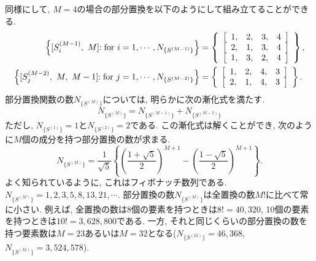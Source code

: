 同様にして, $M=4$の場合の部分置換を以下のようにして組み立てることができる. 
\begin{align}
  \left\{ [S_{i}^{(M-1)},~ M] \mathrm{ : for }~ i = 1, \cdots, N_{\{S^{(M-1)}\}}\right\}
 &=
  \left\{
         \begin{array}[tb]{cc}
          \left[\begin{array}{cccc} 1, & 2, & 3, & 4 \end{array} \right] \\
          \left[\begin{array}{cccc} 2, & 1, & 3, & 4 \end{array} \right] \\
          \left[\begin{array}{cccc} 1, & 3, & 2, & 4 \end{array} \right]
         \end{array}
  \right\},
  \notag
  \\
  \left\{ [S_{j}^{(M-2)},~ M ,~ M-1]
		  \mathrm{ : for }~ j = 1, \cdots, N_{\{S^{(M-2)}\}}
  \right\}
 &=
  \left\{
         \begin{array}[tb]{cc}
          \left[\begin{array}{cccc} 1, & 2, & 4, & 3 \end{array} \right] \\
          \left[\begin{array}{cccc} 2, & 1, & 4, & 3 \end{array} \right]
         \end{array}
  \right\} .
 \notag
\end{align}
部分置換関数の数$N_{\{S^{(M)}\}}$については, 明らかに次の漸化式を満たす. 
\begin{equation}
	N_{\{S^{(M)}\}} = N_{\{S^{(M-1)}\}} + N_{\{S^{(M-2)}\}}
\end{equation}
ただし, $N_{\{S^{(1)}\}} = 1$と$N_{\{S^{(2)}\}} = 2$である. 
この漸化式は解くことができ, 次のように$M$個の成分を持つ部分置換の数が求まる. 
\begin{equation}
	N_{\{S^{(M)}\}} = \frac{1}{\sqrt{5}}
          \left\{
                  \left(\frac{1+\sqrt{5}}{2}\right)^{M+1}
                - \left(\frac{1-\sqrt{5}}{2}\right)^{M+1}
          \right\}.
\end{equation}
よく知られているように, これはフィボナッチ数列である. 
$N_{\{S^{(M)}\}} = 1, 2, 3, 5, 8, 13, 21, \cdots$.
部分置換の数$N_{\{S^{(M)}\}}$は全置換の数$M!$に比べて常に小さい. 
例えば, 全置換の数は8個の要素を持つときは$8! = 40,320$, 10個の要素を持つときは$10! = 3,628,800$である. 
一方, それと同じくらいの部分置換の数を持つ要素数は$M=23$あるいは$M=32$となる($N_{\{S^{(23)}\}} = 46,368$, $N_{\{S^{(32)}\}} = 3,524,578$). 

